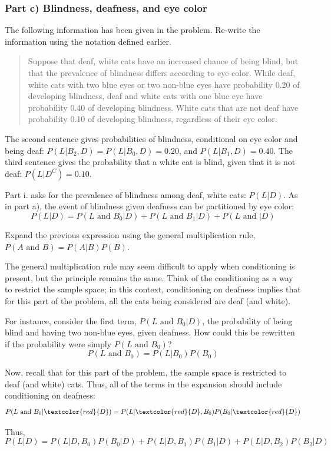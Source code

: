 \subsubsection{Part c) Blindness, deafness, and eye color}

\begin{example}{The following information has been given in the problem. Re-write the information using the notation defined earlier.
		\begin{quote}
			Suppose that deaf, white cats have an increased chance of being blind, but that the prevalence of blindness differs according to eye color. While deaf, white cats with two blue eyes or two non-blue eyes have probability 0.20 of developing blindness, deaf and white cats with one blue eye have probability 0.40 of developing blindness. White cats that are not deaf have probability 0.10 of developing blindness, regardless of their eye color.
		\end{quote}}

The second sentence gives probabilities of blindness, conditional on eye color and being deaf: $P(L|B_2, D) = P(L|B_0, D) = 0.20$, and $P(L|B_1, D) = 0.40$. The third sentence gives the probability that a white cat is blind, given that it is not deaf: $P(L|D^C) = 0.10$.  

\end{example}

Part i. asks for the prevalence of blindness among deaf, white cats: $P(L|D)$. As in part a), the event of blindness given deafness can be partitioned by eye color:
\[P(L|D) = P(L \textrm{ and } B_0|D) + P(L \textrm{ and } B_1 | D) + P(L \textrm{ and } |D)\]

\begin{example}{Expand the previous expression using the general multiplication rule, $P(A \textrm{ and } B) = P(A|B)P(B)$.}
	
	The general multiplication rule may seem difficult to apply when conditioning is present, but the principle remains the same. Think of the conditioning as a way to restrict the sample space; in this context, conditioning on deafness implies that for this part of the problem, all the cats being considered are deaf (and white). 
	
	For instance, consider the first term, $P(L \textrm{ and } B_0|D)$, the probability of being blind and having two non-blue eyes, given deafness. How could this be rewritten if the probability were simply $P(L \textrm{ and } B_0)$? 
	\[P(L \textrm{ and } B_0) = P(L|B_0)P(B_0) \]
	
	Now, recall that for this part of the problem, the sample space is restricted to deaf (and white) cats. Thus, all of the terms in the expansion should include conditioning on deafness:
	\[P(L \textrm{ and } B_0|\textcolor{red}{D}) = P(L|\textcolor{red}{D}, B_0)P(B_0|\textcolor{red}{D}) \]
	
	Thus, 
	\[P(L|D) = P(L|D, B_0)P(B_0|D) + P(L|D, B_1)P(B_1|D) + P(L|D, B_2)P(B_2|D)\]
\end{example}


